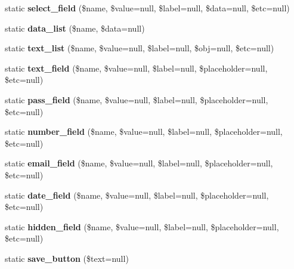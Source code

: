 \begin{DoxyCompactItemize}
static {\bfseries select\+\_\+field} (\$name, \$value=null, \$label=null, \$data=null, \$etc=null)
\item 
\mbox{\label{class_component_ac722df7a18c38959b96d56af618d6df9}} 
static {\bfseries data\+\_\+list} (\$name, \$data=null)
\item 
\mbox{\label{class_component_a36daf8e66edbc7ac8101b2d092767557}} 
static {\bfseries text\+\_\+list} (\$name, \$value=null, \$label=null, \$obj=null, \$etc=null)
\item 
\mbox{\label{class_component_a0bb8f7cbe578dc02d1de0baabd981584}} 
static {\bfseries text\+\_\+field} (\$name, \$value=null, \$label=null, \$placeholder=null, \$etc=null)
\item 
\mbox{\label{class_component_a8b530819d36968a4d976588899740a08}} 
static {\bfseries pass\+\_\+field} (\$name, \$value=null, \$label=null, \$placeholder=null, \$etc=null)
\item 
\mbox{\label{class_component_a10fcfdf903c0a8483605ce0f9862a73d}} 
static {\bfseries number\+\_\+field} (\$name, \$value=null, \$label=null, \$placeholder=null, \$etc=null)
\item 
\mbox{\label{class_component_aeea610044c5a49f21f1e22c3e19cf1b4}} 
static {\bfseries email\+\_\+field} (\$name, \$value=null, \$label=null, \$placeholder=null, \$etc=null)
\item 
\mbox{\label{class_component_a4c0086fa795ad9c75fbf83313ac02ae6}} 
static {\bfseries date\+\_\+field} (\$name, \$value=null, \$label=null, \$placeholder=null, \$etc=null)
\item 
\mbox{\label{class_component_a7c42bda629a6afdff8f95ebb1af30682}} 
static {\bfseries hidden\+\_\+field} (\$name, \$value=null, \$label=null, \$placeholder=null, \$etc=null)
\item 
\mbox{\label{class_component_acb686934131da772e5ee51cb361d4833}} 
static {\bfseries save\+\_\+button} (\$text=null)
\item 
\mbox{\label{class_component_ae58c325e2b8d63fa0c912c909dfc4844}} 

\end{DoxyCompactItemize}
